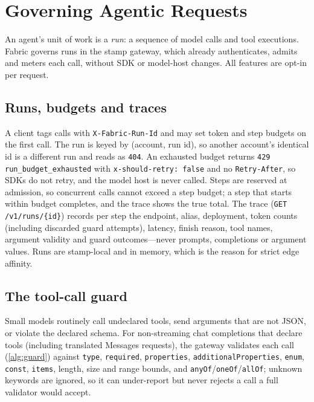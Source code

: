 \documentclass[conference,letterpaper]{IEEEtran}
\newcommand{\sys}{Fabric}
\newcommand{\code}[1]{\texttt{\small #1}}
\begin{document}
\section{Governing Agentic Requests}
\label{sec:agents}

An agent's unit of work is a \emph{run}: a sequence of model calls and tool executions.
\sys{} governs runs in the stamp gateway, which already authenticates, admits and meters each
call, without SDK or model-host changes. All features are opt-in per request.

\subsection{Runs, budgets and traces}
A client tags calls with \code{X-Fabric-Run-Id} and may set token and step budgets on the first
call. The run is keyed by (account, run id), so another account's identical id is a different
run and reads as \code{404}. An exhausted budget returns \code{429 run\_budget\_exhausted} with
\code{x-should-retry: false} and no \code{Retry-After}, so SDKs do not retry, and the model
host is never called. Steps are reserved at admission, so concurrent calls cannot exceed a step
budget; a step that starts within budget completes, and the trace shows the true total. The trace (\code{GET /v1/runs/\{id\}}) records per step the endpoint,
alias, deployment, token counts (including discarded guard attempts), latency, finish reason,
tool names, argument validity and guard outcomes---never prompts, completions or argument
values. Runs are stamp-local and in memory, which is the reason for strict edge affinity.

\subsection{The tool-call guard}
\label{sec:guard}
Small models routinely call undeclared tools, send arguments that are not JSON, or violate the
declared schema. For non-streaming chat completions that declare tools (including translated
Messages requests), the gateway validates each call (\cref{alg:guard}) against \code{type},
\code{required}, \code{properties}, \code{additionalProperties}, \code{enum}, \code{const},
\code{items}, length, size and range bounds, and \code{anyOf}/\code{oneOf}/\code{allOf};
unknown keywords are ignored, so it can under-report but never rejects a call a full validator
would accept.
\end{document}

